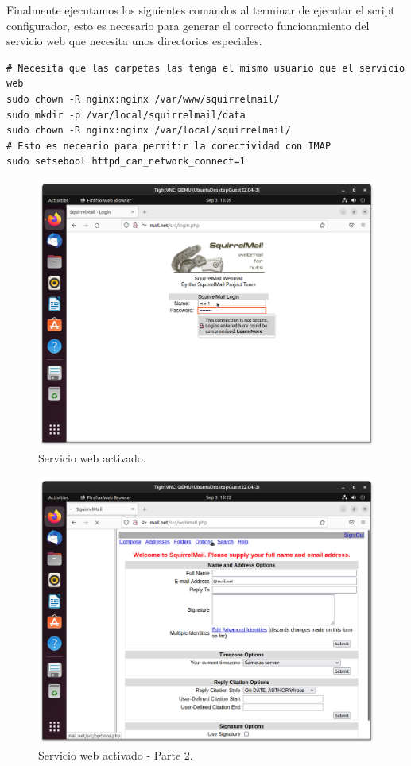 Finalmente ejecutamos los siguientes comandos al terminar de ejecutar el script configurador, esto es necesario para generar el correcto funcionamiento del servicio web que necesita unos directorios especiales.

\begin{lstlisting}[style=mybash]
# Necesita que las carpetas las tenga el mismo usuario que el servicio web
sudo chown -R nginx:nginx /var/www/squirrelmail/
sudo mkdir -p /var/local/squirrelmail/data
sudo chown -R nginx:nginx /var/local/squirrelmail/
# Esto es neceario para permitir la conectividad con IMAP
sudo setsebool httpd_can_network_connect=1
\end{lstlisting}

\begin{figure}[H]
	\centering
	\includegraphics[scale=0.30]{27}
	\caption{Servicio web activado.}
\end{figure}

\begin{figure}[H]
	\centering
	\includegraphics[scale=0.30]{28}
	\caption{Servicio web activado - Parte 2.}
\end{figure}

